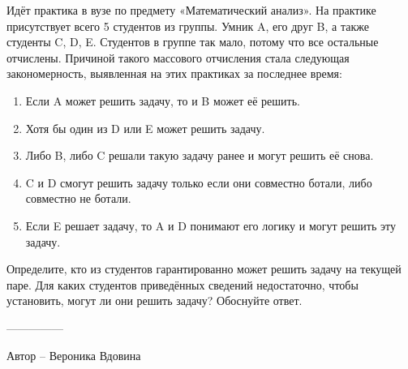 \question
Идёт практика в вузе по предмету «Математический анализ». На практике присутствует всего 5 студентов из группы. Умник A, его друг B, а также студенты C, D, E. Студентов в группе так мало, потому что все остальные отчислены. Причиной такого массового отчисления стала следующая закономерность, выявленная на этих практиках за последнее время:

\begin{enumerate}
  \item Если A может решить задачу, то и B может её решить.
  \item Хотя бы один из D или E может решить задачу.
  \item Либо B, либо C решали такую задачу ранее и могут решить её снова.
  \item C и D смогут решить задачу только если они совместно ботали, либо совместно не ботали.
  \item Если E решает задачу, то A и D понимают его логику и могут решить эту задачу.
\end{enumerate}
Определите, кто из студентов гарантированно может решить задачу на текущей паре. Для каких студентов приведённых сведений недостаточно, чтобы установить, могут ли они решить задачу? Обоснуйте ответ.

---------------

Автор -- Вероника Вдовина